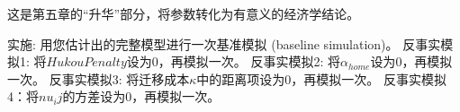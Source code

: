\documentclass[master, final]{zufe-thesis}
\begin{document}
这是第五章的“升华”部分，将参数转化为有意义的经济学结论。





实施:
用您估计出的完整模型进行一次基准模拟 (baseline simulation)。
反事实模拟1: 将$HukouPenalty$设为$0$，再模拟一次。
反事实模拟2: 将$\alpha_{home}$设为$0$，再模拟一次。
反事实模拟3: 将迁移成本$\kappa$中的距离项设为$0$，再模拟一次。
反事实模拟4：将$nu_ij$的方差设为0，再模拟一次。






\end{document}
